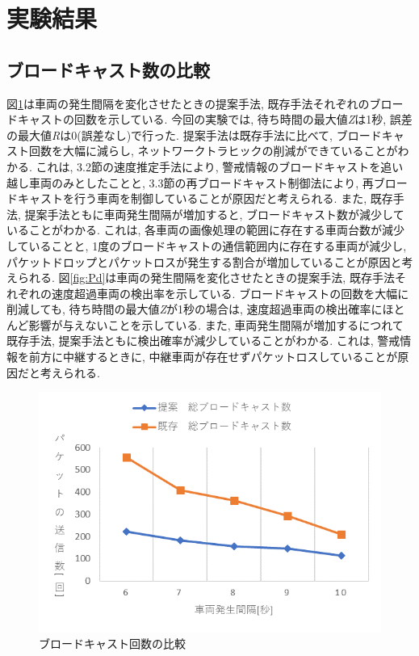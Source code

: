 \documentclass[10pt]{jreport}
\begin{document}
\section{実験結果}
\subsection{ブロードキャスト数の比較}

図\ref{fig:brcount}は車両の発生間隔を変化させたときの提案手法, 既存手法それぞれのブロードキャストの回数を示している. 今回の実験では, 待ち時間の最大値{\it Z}は1秒, 誤差の最大値{\it R}は0(誤差なし)で行った. 提案手法は既存手法に比べて, ブロードキャスト回数を大幅に減らし, ネットワークトラヒックの削減ができていることがわかる. これは, 3.2節の速度推定手法により, 警戒情報のブロードキャストを追い越し車両のみとしたことと, 3.3節の再ブロードキャスト制御法により, 再ブロードキャストを行う車両を制御していることが原因だと考えられる. また, 既存手法, 提案手法ともに車両発生間隔が増加すると, ブロードキャスト数が減少していることがわかる. これは, 各車両の画像処理の範囲に存在する車両台数が減少していることと, 1度のブロードキャストの通信範囲内に存在する車両が減少し, パケットドロップとパケットロスが発生する割合が増加していることが原因と考えられる. 図\ref{fig:Pd}は車両の発生間隔を変化させたときの提案手法, 既存手法それぞれの速度超過車両の検出率を示している. ブロードキャストの回数を大幅に削減しても, 待ち時間の最大値{\it Z}が1秒の場合は, 速度超過車両の検出確率にほとんど影響が与えないことを示している. また, 車両発生間隔が増加するにつれて既存手法, 提案手法ともに検出確率が減少していることがわかる. これは, 警戒情報を前方に中継するときに, 中継車両が存在せずパケットロスしていることが原因だと考えられる.


\begin{figure}[H]
\centering
\includegraphics[width=14cm]{figures/4_3br.png}
\caption{ブロードキャスト回数の比較}
\label{fig:brcount}
\end{figure}
\end{document}
